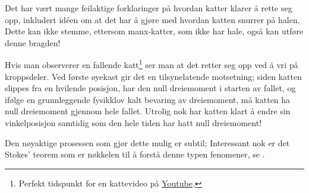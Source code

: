 Det har vært mange feilaktige forklaringer på hvordan katter klarer å rette seg opp, inkludert idéen om at det har å gjøre med hvordan katten snurrer på halen. 
Dette kan ikke stemme, ettersom manx-katter, som ikke har hale, også kan utføre denne bragden!

Hvis man observerer en fallende katt\footnote{Perfekt tidspunkt for en kattevideo på \href{https://www.youtube.com/watch?v=NCRSafiD4BY}{Youtube}.} ser man at det 
retter seg opp ved å
vri på kroppsdeler.
Ved første øyekast gir det en tilsynelatende motsetning; siden katten slippes fra en hvilende posisjon, har den null dreiemoment i starten av fallet, og ifølge en grunnleggende fysikklov kalt bevaring av dreiemoment, må katten ha null dreiemoment gjennom hele fallet. Utrolig nok har katten klart å endre sin vinkelposisjon samtidig som den hele tiden har hatt null dreiemoment! 

Den nøyaktige prosessen som gjør dette mulig er subtil;  Interessant nok er det Stokes’ teorem som er nøkkelen til å forstå denne typen fenomener, se \cite{Bat_cat}.


\FloatBarrier